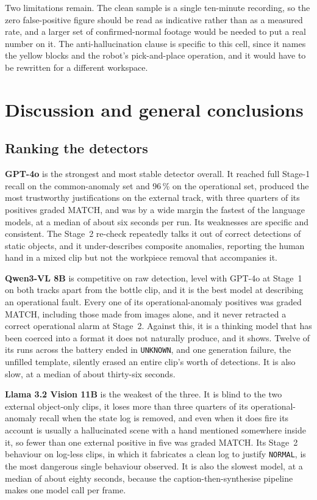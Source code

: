 \documentclass[11pt,a4paper]{article}
\begin{document}
Two limitations remain. The clean sample is a single ten-minute recording,
so the zero false-positive figure should be read as indicative rather than
as a measured rate, and a larger set of confirmed-normal footage would be
needed to put a real number on it. The anti-hallucination clause is
specific to this cell, since it names the yellow blocks and the robot's
pick-and-place operation, and it would have to be rewritten for a
different workspace.

\section{Discussion and general conclusions}
\label{sec:discussion}

\subsection{Ranking the detectors}

\textbf{GPT-4o} is the strongest and most stable detector overall. It
reached full Stage-1 recall on the common-anomaly set and 96\,\% on the
operational set, produced the most trustworthy justifications on the
external track, with three quarters of its positives graded MATCH, and was
by a wide margin the fastest of the language models, at a median of about
six seconds per run. Its weaknesses are specific and consistent. The
Stage~2 re-check repeatedly talks it out of correct detections of static
objects, and it under-describes composite anomalies, reporting the human
hand in a mixed clip but not the workpiece removal that accompanies it.

\textbf{Qwen3-VL 8B} is competitive on raw detection, level with GPT-4o at
Stage~1 on both tracks apart from the bottle clip, and it is the best
model at describing an operational fault. Every one of its
operational-anomaly positives was graded MATCH, including those made from
images alone, and it never retracted a correct operational alarm at
Stage~2. Against this, it is a thinking model that has been coerced into a
format it does not naturally produce, and it shows. Twelve of its runs
across the battery ended in \texttt{UNKNOWN}, and one generation failure,
the unfilled template, silently erased an entire clip's worth of
detections. It is also slow, at a median of about thirty-six seconds.

\textbf{Llama 3.2 Vision 11B} is the weakest of the three. It is blind to
the two external object-only clips, it loses more than three quarters of
its operational-anomaly recall when the state log is removed, and even
when it does fire its account is usually a hallucinated scene with a hand
mentioned somewhere inside it, so fewer than one external positive in five
was graded MATCH. Its Stage~2 behaviour on log-less clips, in which it
fabricates a clean log to justify \texttt{NORMAL}, is the most dangerous
single behaviour observed. It is also the slowest model, at a median of
about eighty seconds, because the caption-then-synthesise pipeline makes
one model call per frame.
\end{document}
